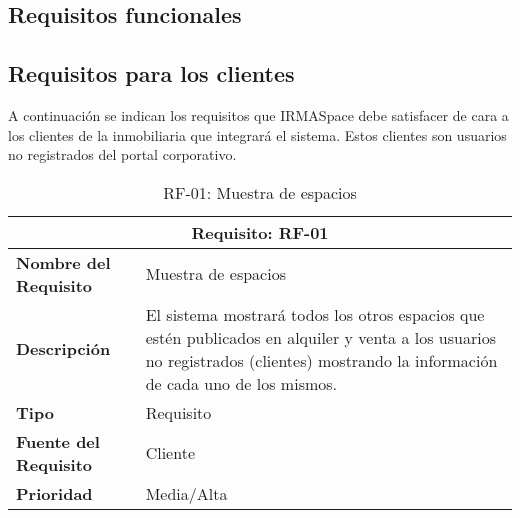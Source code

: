 \subsection{Requisitos funcionales}

\subsection{Requisitos para los clientes}

\par A continuación se indican los requisitos que IRMASpace debe satisfacer de cara a los clientes de la inmobiliaria que integrará el sistema. Estos clientes son usuarios no registrados del portal corporativo.

\begin{table}[H]
\begin{center}
\begin{tabular}{p{} p{7cm}}
\multicolumn{2}{c}{\textbf{Requisito: RF-01} } \\
\hline \hline
\textbf{Nombre del Requisito} &  Muestra de espacios \\
\hline
\textbf{Descripción} & El sistema mostrará todos los otros espacios que estén publicados en alquiler y venta a los usuarios no registrados (clientes) mostrando la información de cada uno de los mismos.\\
\hline
\textbf{Tipo} & Requisito  \\
\hline
\textbf{Fuente del Requisito} &  Cliente \\
\hline
\textbf{Prioridad} &  Media/Alta \\ \hline
\end{tabular}
\caption{RF-01: Muestra de espacios}
\label{tab:RF-01}
\end{center}
\end{table}

